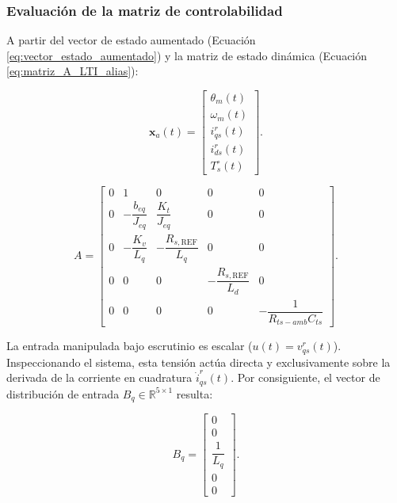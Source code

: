 \documentclass[10pt,a4paper]{article}
\begin{document}
\subsubsection{Evaluación de la matriz de controlabilidad}

A partir del vector de estado aumentado (Ecuación \eqref{eq:vector_estado_aumentado}) y la matriz de estado dinámica (Ecuación \eqref{eq:matriz_A_LTI_alias}):

\begin{equation*}
    \mathbf{x}_a(t)=
    \begin{bmatrix}
        \theta_m(t)\\
        \omega_m(t)\\
        i_{qs}^r(t)\\
        i_{ds}^r(t)\\
        T_s^\circ(t)
    \end{bmatrix}.
\end{equation*}

\begin{equation*}
    A =
    \begin{bmatrix}
        0 & 1 & 0 & 0 & 0\\[3mm]
        0 & -\dfrac{b_{eq}}{J_{eq}} & \dfrac{K_t}{J_{eq}} & 0 & 0\\[3mm]
        0 & -\dfrac{K_v}{L_q} & -\dfrac{R_{s,\mathrm{REF}}}{L_q} & 0 & 0\\[3mm]
        0 & 0 & 0 & -\dfrac{R_{s,\mathrm{REF}}}{L_d} & 0\\[3mm]
        0 & 0 & 0 & 0 & -\dfrac{1}{R_{ts-amb}C_{ts}}
    \end{bmatrix}.
\end{equation*}

La entrada manipulada bajo escrutinio es escalar ($u(t) = v_{qs}^r(t)$). 
Inspeccionando el sistema, esta tensión actúa directa y exclusivamente sobre la derivada de la corriente en cuadratura $\dot{i}_{qs}^r(t)$. 
Por consiguiente, el vector de distribución de entrada $B_q \in \mathbb{R}^{5 \times 1}$ resulta:

\begin{equation}
    B_q =
    \begin{bmatrix}
        0 \\[1mm]
        0 \\[1mm]
        \dfrac{1}{L_q} \\[2mm]
        0 \\[1mm]
        0
    \end{bmatrix}.
\end{equation}
\end{document}
